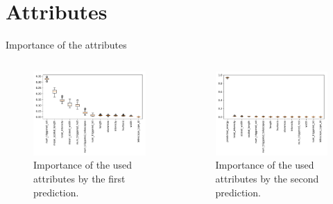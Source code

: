 \documentclass[aspectratio=1610, professionalfonts, 9pt]{beamer}
\begin{document}
\section{Attributes}
  \begin{frame}{Importance of the attributes}
    \begin{columns}
      \begin{column}{0.5\textwidth}
        \begin{figure}
          \centering
          \includegraphics[width=\textwidth]{Plots/feautureimportance_boxplot.pdf}
          \caption{Importance of the used attributes by the first prediction.}
        \end{figure}
      \end{column}
      \begin{column}{0.5\textwidth}
        \begin{figure}
          \centering
          \includegraphics[width=\textwidth]{Plots/feautureimportance_boxplot_secondForest.pdf}
          \caption{Importance of the used attributes by the second prediction.}
        \end{figure}
      \end{column}
    \end{columns}
  \end{frame}
\end{document}
